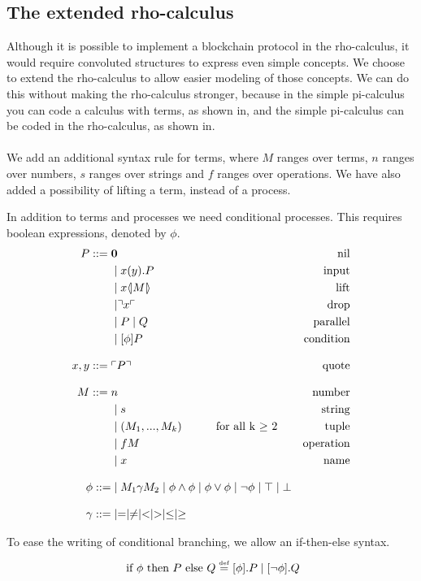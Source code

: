 

\subsection{The extended rho-calculus} \label{sec:addsyntax}
Although it is possible to implement a blockchain protocol in the rho-calculus, it would require convoluted structures to express even simple concepts.
We choose to extend the rho-calculus to allow easier modeling of those concepts.
We can do this without making the rho-calculus stronger, because in the simple pi-calculus you can code a calculus with terms, as shown in\citep{Baldamus2005}, and the simple pi-calculus can be coded in the rho-calculus, as shown in\citep{Meredith2005}.\\
\\
We add an additional syntax rule for terms, where $M$ ranges over terms, $n$ ranges over numbers, $s$ ranges over strings and $f$ ranges over operations. We have also added a possibility of lifting a term, instead of a process.

In addition to terms and processes we need conditional processes. This requires boolean expressions, denoted by \ensuremath{\phi}.
\begin{align*}
P  ::= \; &  \mathbf{0} & \text{nil} \\
      & \mid x(y).P & \text{input} \\
	  & \mid x \langle \! | M | \! \rangle&\text{lift}\\
      & \mid \urcorner x \ulcorner & \text{drop} \\
      & \mid P \mid Q & \text{parallel} \\
      & \mid [\phi] P & \text{condition} \\[3mm]
    x,y ::= \; & \ulcorner P \urcorner & \text{quote}\\[3mm]
M::=\; & n &\text{number}\\
 	  &\mid s &\text{string}\\
 	  &\mid (M_1,...,M_k)\quad\quad\quad \text{for all k $\geq$ 2} &\text{tuple}\\
 	  &\mid fM &\text{operation}\\
 	  &\mid x &\text{name}\\[3mm]
\phi ::=& \mid M_1\gamma M_2 \mid \phi\land\phi \mid \phi\lor\phi \mid \neg\phi \mid \top \mid \bot\\[3mm]
\gamma ::=& \mid = \mid \neq \mid < \mid > \mid \leq \mid \geq
\end{align*}

To ease the writing of conditional branching, we allow an if-then-else syntax.
\begin{align*}
	\text{ if }\phi\text{ then }P\text{ else }Q \overset{\underset{\mathrm{def}}{}}{=} [\phi].P \mid [\neg \phi].Q
\end{align*}


